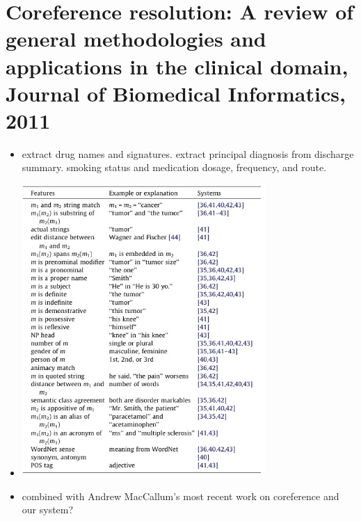 \documentclass[pdftext,twoside,11pt]{article}
\begin{document}
\section{Coreference resolution: A review of general methodologies and applications
in the clinical domain, Journal of Biomedical Informatics, 2011}
\label{sec:intro} 
\begin{itemize}
\item  extract drug names and signatures. extract principal diagnosis from discharge summary.
       smoking status and medication dosage, frequency, and route.
\item   \includegraphics[height=30em]{feature.jpg}
\item   combined with Andrew MacCallum's most recent work on coreference and our system? 
\end{itemize}
\end{document}
